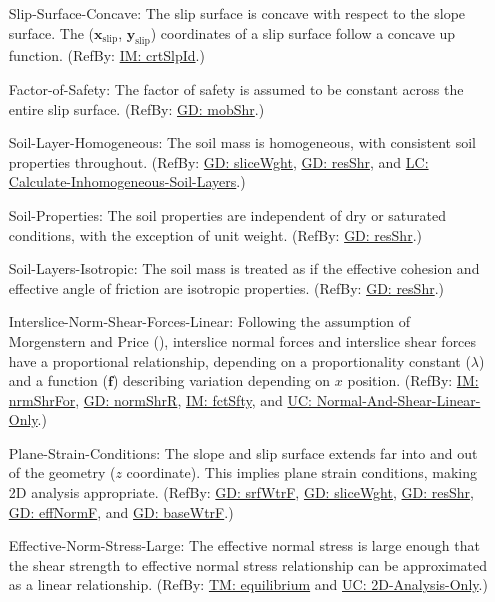 \documentclass[12pt]{article}
\begin{document}
\begin{itemize}
\item[Slip-Surface-Concave:\phantomsection\label{assumpSSC}]The slip surface is concave with respect to the slope surface. The (${\mathbf{x}_{\text{slip}}}$, ${\mathbf{y}_{\text{slip}}}$) coordinates of a slip surface follow a concave up function. (RefBy: \hyperref[IM:crtSlpId]{IM: crtSlpId}.)
\item[Factor-of-Safety:\phantomsection\label{assumpFOS}]The factor of safety is assumed to be constant across the entire slip surface. (RefBy: \hyperref[GD:mobShr]{GD: mobShr}.)
\item[Soil-Layer-Homogeneous:\phantomsection\label{assumpSLH}]The soil mass is homogeneous, with consistent soil properties throughout. (RefBy: \hyperref[GD:sliceWght]{GD: sliceWght}, \hyperref[GD:resShr]{GD: resShr}, and \hyperref[LC_inhomogeneous]{LC: Calculate-Inhomogeneous-Soil-Layers}.)
\item[Soil-Properties:\phantomsection\label{assumpSP}]The soil properties are independent of dry or saturated conditions, with the exception of unit weight. (RefBy: \hyperref[GD:resShr]{GD: resShr}.)
\item[Soil-Layers-Isotropic:\phantomsection\label{assumpSLI}]The soil mass is treated as if the effective cohesion and effective angle of friction are isotropic properties. (RefBy: \hyperref[GD:resShr]{GD: resShr}.)
\item[Interslice-Norm-Shear-Forces-Linear:\phantomsection\label{assumpINSFL}]Following the assumption of Morgenstern and Price (\cite{morgenstern1965}), interslice normal forces and interslice shear forces have a proportional relationship, depending on a proportionality constant ($λ$) and a function ($\mathbf{f}$) describing variation depending on $x$ position. (RefBy: \hyperref[IM:nrmShrFor]{IM: nrmShrFor}, \hyperref[GD:normShrR]{GD: normShrR}, \hyperref[IM:fctSfty]{IM: fctSfty}, and \hyperref[UC_normshearlinear]{UC: Normal-And-Shear-Linear-Only}.)
\item[Plane-Strain-Conditions:\phantomsection\label{assumpPSC}]The slope and slip surface extends far into and out of the geometry ($z$ coordinate). This implies plane strain conditions, making 2D analysis appropriate. (RefBy: \hyperref[GD:srfWtrF]{GD: srfWtrF}, \hyperref[GD:sliceWght]{GD: sliceWght}, \hyperref[GD:resShr]{GD: resShr}, \hyperref[GD:effNormF]{GD: effNormF}, and \hyperref[GD:baseWtrF]{GD: baseWtrF}.)
\item[Effective-Norm-Stress-Large:\phantomsection\label{assumpENSL}]The effective normal stress is large enough that the shear strength to effective normal stress relationship can be approximated as a linear relationship. (RefBy: \hyperref[TM:equilibrium]{TM: equilibrium} and \hyperref[UC_2donly]{UC: 2D-Analysis-Only}.)

\end{itemize}
\end{document}
